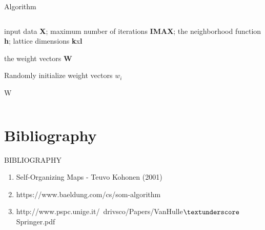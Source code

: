 \documentclass{beamer}
\begin{document}
	\begin{frame}{Algorithm}

		\begin{columns}


				\begin{algorithm}[H]
			
					\caption{Self-Organizing Map Algorithm}
					\begin{algorithmic}[1]		
					
						\REQUIRE input data \textbf{X}; maximum number of iterations \textbf{IMAX}; the neighborhood function \textbf{h}; lattice dimensions \textbf{k}x\textbf{l}
			
						\ENSURE the weight vectors \textbf{W}
						
						\STATE Randomly initialize weight vectors $w_i$	
									

						  \ENDFOR
				
						\RETURN W
					\end{algorithmic}
				\end{algorithm}
		\end{columns}
	\end{frame}
	


\section{Bibliography}
	
	\begin{frame}
	
		\begin{center}

			\Huge BIBLIOGRAPHY
		\end{center}
	\end{frame}


	\begin{frame}
	
		\begin{enumerate}
			
			\item Self-Organizing Maps - Teuvo Kohonen (2001)
			\item https://www.baeldung.com/cs/som-algorithm
			\item http://www.pspc.unige.it/~drivsco/Papers/VanHulle$\textunderscore$Springer.pdf
		\end{enumerate}
	\end{frame}
\end{document}
